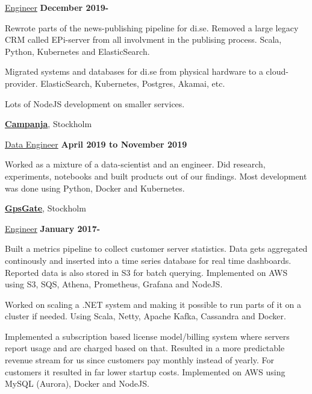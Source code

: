 \documentclass[10pt]{article}
\renewcommand\textit[1]{\underline{#1}}
\newcommand{\halfblankline}{\quad\vspace{-0.5\baselineskip}\pagebreak[3]}
\begin{document}
\begin{outerlist}
\item[] \textit{Engineer}
  \hfill \textbf{December 2019-}
  \begin{innerlist}
  \item
        Rewrote parts of the news-publishing pipeline for di.se. Removed
        a large legacy CRM called EPi-server from all involvment in the publising
        process.
        Scala, Python, Kubernetes and ElasticSearch.
  \item
        Migrated systems and databases for di.se from physical hardware to a
        cloud-provider.
        ElasticSearch, Kubernetes, Postgres, Akamai, etc.
  \item
        Lots of NodeJS development on smaller services.
  \end{innerlist}
\end{outerlist}
\halfblankline

\href{http://campanja.com/}{\textbf{Campanja}},
Stockholm

\begin{outerlist}
\item[] \textit{Data Engineer}
	\hfill \textbf{April 2019 to November 2019}
	\begin{innerlist}
	\item
        Worked as a mixture of a data-scientist and an engineer. Did research,
        experiments, notebooks and built products out of our findings.
        Most development was done using Python, Docker and Kubernetes.
	\end{innerlist}
\end{outerlist}
\halfblankline

\href{http://gpsgate.com/}{\textbf{GpsGate}},
Stockholm

\begin{outerlist}
\item[] \textit{Engineer}
  \hfill \textbf{January 2017-}
  \begin{innerlist}
  \item
    Built a metrics pipeline to collect customer server statistics.
    Data gets aggregated continously and inserted into a time series database
    for real time dashboards. Reported data is also stored in S3 for batch
    querying.
    Implemented on AWS using S3, SQS, Athena, Prometheus, Grafana and NodeJS.
  \item
    Worked on scaling a .NET system and making it possible to run parts of it on
    a cluster if needed. Using Scala, Netty, Apache Kafka, Cassandra and Docker.
  \item
    Implemented a subscription based license model/billing system where servers
    report usage and are charged based on that. Resulted in a more predictable
    revenue stream for us since customers pay monthly instead of yearly. For
    customers it resulted in far lower startup costs.
    Implemented on AWS using MySQL (Aurora), Docker and NodeJS.
  \end{innerlist}
\end{outerlist}
\end{document}
